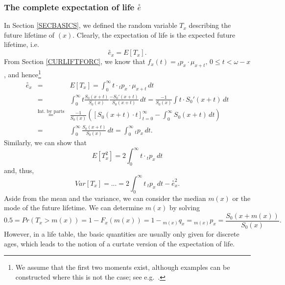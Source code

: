 \documentclass[11pt,fleqn,oneside]{book}
\begin{document}
\subsubsection*{The complete expectation of life $\stackrel{\circ}{e}$}
In Section \ref{SECBASICS}, we defined the random variable $T_x$ describing the future lifetime of $(x)$. Clearly, the expectation of life is the expected future lifetime, i.e.
$$
\stackrel{\circ}{e}_x = E[T_x].
$$
From Section \ref{CURLIFTFORC}, we know that $f_{x}(t)={_tp_x}\cdot{\mu_{x+t}}, \, 0\leq t < \omega - x$, and hence\footnote{We assume that the first two moments exist, although examples can be constructed where this is not the case; see e.g.\ \cite{BOWERS}.}
\begin{eqnarray*}
\stackrel{\circ}{e}_x &=& E[T_x] = \int_0^\infty t \cdot {_tp_x}\cdot{\mu_{x+t}}\,dt \\
&=& \int_0^\infty t \frac{S_0(x+t)}{S_0(x)} \frac{-S_0'(x+t)}{S_0(x+t)}\,dt  = \frac{-1}{S_0(x)} \int t\cdot S_0'(x+t)\,dt \\
&\stackrel{\text{Int.\ by parts}}{=}& \frac{-1}{S_0(x)} \left(\left[S_0(x+t)\cdot t\right]_{t=0}^{\infty} - \int_0^{\infty} S_0(x+t)\,dt \right)\\
&=& \int_0^\infty \frac{S_0(x+t)}{S_0(x)}\,dt = \int_0^{\infty} {_tp_x}\,dt.
\end{eqnarray*}
Similarly, we can show that
$$
E[T^2_x] = 2 \int_0^{\infty} t \cdot {_tp_x}\,dt 
$$
and, thus,
\begin{equation}
Var[T_x] =...= 2 \int_0^{\infty} t \,{_tp_x}\,dt - \stackrel{\circ}{e}^2_x. \label{EQVARTX}
\end{equation}
Aside from the mean and the variance, we can consider the median $m(x)$ or the mode of the future lifetime. We can determine $m(x)$ by solving 
$$
0.5 = Pr(T_x>m(x)) = 1- F_{x}(m(x)) = 1 - {_{m(x)}q_x} = {_{m(x)}p_x} = \frac{S_0(x+m(x))}{S_0(x)}.
$$
However, in a life table, the basic quantities are usually only given for discrete ages, which leads to the notion of a curtate version of the expectation of life.
\end{document}
